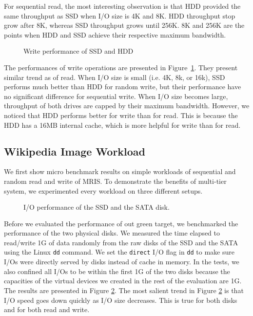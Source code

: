 For sequential read, the most interesting observation is that HDD
provided the same throughput as SSD when I/O size is 4K and 8K. HDD
throughput stop grow after 8K, whereas SSD throughput grows until
256K. 8K and 256K are the points when HDD and SSD achieve their
respective maximum bandwidth.

\begin{figure}[t]
\begin{centering}
\caption{Write performance of SSD and HDD}
\label{fig:drivewrite}
\end{centering}
\end{figure}

The performances of write operations are presented in
Figure~\ref{fig:drivewrite}. They present similar trend as of read.
When I/O size is small (i.e. 4K, 8k, or 16k), SSD performs much better
than HDD for random write, but their performance have no significant
difference for sequential write. When I/O size becomes large,
throughput of both drives are capped by their maximum bandwidth.
However, we noticed that HDD performs better for write than for read.
This is because the HDD has a 16MB internal cache, which is more
helpful for write than for read.

\subsection{Wikipedia Image Workload}

We first show micro benchmark results on simple workloads of
sequential and random read and write of MRIS. To demonstrate the
benefits of multi-tier system, we experimented every workload on three
different setups. 

\begin{figure}[t]
\begin{centering}
\caption{I/O performance of the SSD and the SATA disk. }
\label{fig:ssd_vs_sata}
\end{centering}
\end{figure}

Before we evaluated the performance of out green target, we
benchmarked the performance of the two physical disks.  We measured
the time elapsed to read/write 1G of data randomly from the raw disks
of the SSD and the SATA using the Linux \texttt{dd} command. We set
the \texttt{direct} I/O flag in \texttt{dd} to make sure I/Os were
directly served by disks instead of cache in memory.  In the tests, we
also confined all I/Os to be within the first 1G of the two disks
because the capacities of the virtual devices we created in the rest
of the evaluation are 1G. The results are presented in Figure
\ref{fig:ssd_vs_sata}. The most salient trend in Figure
\ref{fig:ssd_vs_sata} is that I/O speed goes down quickly as I/O size
decreases. This is true for both disks and for both read and write. 

